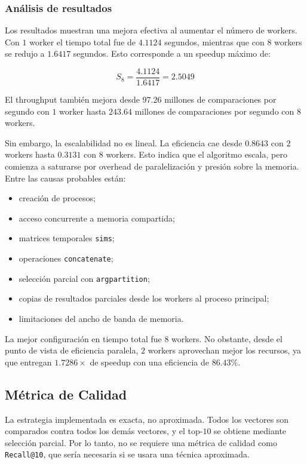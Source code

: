 \documentclass[10pt,a4paper]{article}
\begin{document}
\subsubsection{An\'alisis de resultados}

Los resultados muestran una mejora efectiva al aumentar el n\'umero de workers.
Con $1$ worker el tiempo total fue de $4.1124$ segundos, mientras que con $8$
workers se redujo a $1.6417$ segundos. Esto corresponde a un speedup m\'aximo
de:

\[
S_8 = \frac{4.1124}{1.6417} = 2.5049
\]

El throughput tambi\'en mejora desde $97.26$ millones de comparaciones por
segundo con $1$ worker hasta $243.64$ millones de comparaciones por segundo con
$8$ workers.

Sin embargo, la escalabilidad no es lineal. La eficiencia cae desde $0.8643$ con
$2$ workers hasta $0.3131$ con $8$ workers. Esto indica que el algoritmo escala,
pero comienza a saturarse por overhead de paralelizaci\'on y presi\'on sobre la
memoria. Entre las causas probables est\'an:

\begin{itemize}
    \item creaci\'on de procesos;
    \item acceso concurrente a memoria compartida;
    \item matrices temporales \texttt{sims};
    \item operaciones \texttt{concatenate};
    \item selecci\'on parcial con \texttt{argpartition};
    \item copias de resultados parciales desde los workers al proceso principal;
    \item limitaciones del ancho de banda de memoria.
\end{itemize}

La mejor configuraci\'on en tiempo total fue $8$ workers. No obstante, desde el
punto de vista de eficiencia paralela, $2$ workers aprovechan mejor los recursos,
ya que entregan $1.7286\times$ de speedup con una eficiencia de $86.43\%$.

\subsection{M\'etrica de Calidad}

La estrategia implementada es exacta, no aproximada. Todos los vectores son
comparados contra todos los dem\'as vectores, y el top-$10$ se obtiene mediante
selecci\'on parcial. Por lo tanto, no se requiere una m\'etrica de calidad como
\texttt{Recall@10}, que ser\'ia necesaria si se usara una t\'ecnica aproximada.
\end{document}
